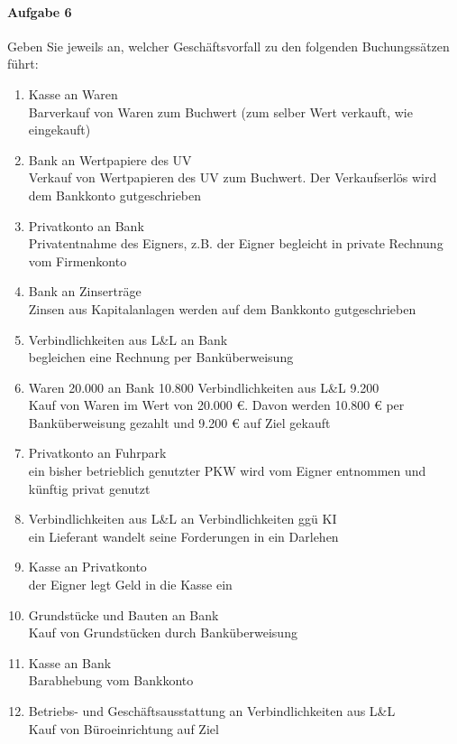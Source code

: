 \documentclass[paper=a4, fontsize=11pt]{scrartcl}
\numberwithin{equation}{section}
\numberwithin{figure}{section}
\numberwithin{table}{section}
\begin{document}
\paragraph{Aufgabe 6}
Geben Sie jeweils an, welcher Geschäftsvorfall zu den folgenden Buchungssätzen führt:
 \\
\begin{enumerate}
\item Kasse an Waren \\
Barverkauf von Waren zum Buchwert (zum selber Wert verkauft, wie eingekauft)
\item Bank an Wertpapiere des UV \\
Verkauf von Wertpapieren des UV zum Buchwert. Der Verkaufserlös wird dem Bankkonto gutgeschrieben
\item Privatkonto an Bank \\
Privatentnahme des Eigners, z.B. der Eigner begleicht in private Rechnung vom Firmenkonto
\item Bank an Zinserträge \\
Zinsen aus Kapitalanlagen werden auf dem Bankkonto gutgeschrieben
\item Verbindlichkeiten aus L\&L an Bank \\
begleichen eine Rechnung per Banküberweisung
\item Waren 20.000 an Bank 10.800 Verbindlichkeiten aus L\&L 9.200 \\
Kauf von Waren im Wert von 20.000 €. Davon werden 10.800 € per Banküberweisung gezahlt und 9.200 € auf Ziel gekauft 
\item Privatkonto an Fuhrpark \\
ein bisher betrieblich genutzter PKW wird vom Eigner entnommen und künftig privat genutzt
\item Verbindlichkeiten aus L\&L an Verbindlichkeiten ggü KI \\
ein Lieferant wandelt seine Forderungen in ein Darlehen
\item Kasse an Privatkonto \\
der Eigner legt Geld in die Kasse ein
\item Grundstücke und Bauten an Bank \\
Kauf von Grundstücken durch Banküberweisung
\item Kasse an Bank \\
Barabhebung vom Bankkonto
\item Betriebs- und Geschäftsausstattung an Verbindlichkeiten aus L\&L \\
Kauf von Büroeinrichtung auf Ziel

\end{enumerate}
\end{document}
